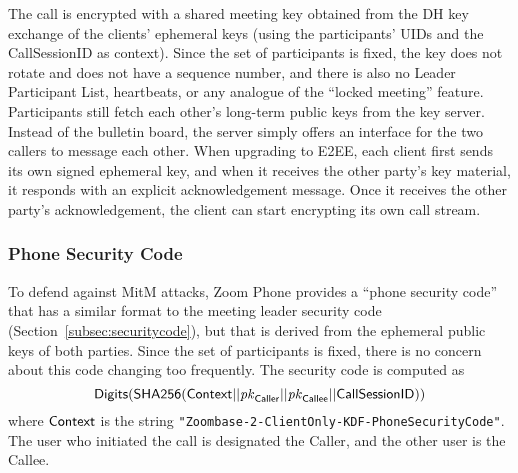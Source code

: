 The call is encrypted with a shared meeting key obtained from the DH key exchange of the clients' ephemeral keys (using the participants' UIDs and the {\sf CallSessionID} as context). Since the set of participants is fixed, the key does not rotate and does not have a sequence number, and there is also no Leader Participant List, heartbeats, or any analogue of the ``locked meeting'' feature.
Participants still fetch each other's long-term public keys from the key server. Instead of the bulletin board, the server simply offers an interface for the two callers to message each other.
When upgrading to E2EE, each client first sends its own signed ephemeral key, and when it receives the other party's key material, it responds with an explicit acknowledgement message. Once it receives the other party's acknowledgement, the client can start encrypting its own call stream.

\subsubsection{Phone Security Code}

To defend against MitM attacks, Zoom Phone provides a ``phone security code'' that has a similar format to the meeting leader security code (Section~\ref{subsec:securitycode}), but that is derived from the ephemeral public keys of both parties. Since the set of participants is fixed, there is no concern about this code changing too frequently. The security code is computed as
$$\mathsf{Digits}({\sf SHA256}({\sf Context} || \mathit{pk}_{\sf Caller} || \mathit{pk}_{\sf Callee} || {\sf CallSessionID}))$$
where ${\sf Context}$ is the string \texttt{"Zoombase-2-ClientOnly-KDF-PhoneSecurityCode"}. The user who initiated the call is designated the {\sf Caller}, and the other user is the {\sf Callee}.

